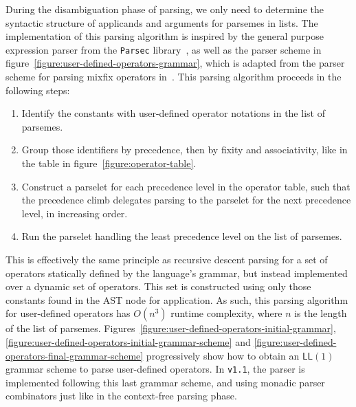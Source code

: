 During the disambiguation phase of parsing, we only need to determine the syntactic structure of applicands and arguments for parsemes in lists.
The implementation of this parsing algorithm is inspired by the general purpose expression parser from the \texttt{Parsec} library~\cite{leijen2001parsec}, as well as the parser scheme in figure~\ref{figure:user-defined-operators-grammar}, which is adapted from the parser scheme for parsing mixfix operators in~\cite{danielsson2008parsing}.
This parsing algorithm proceeds in the following steps:
\begin{enumerate}
\item Identify the constants with user-defined operator notations in the list of parsemes.
\item Group those identifiers by precedence, then by fixity and associativity, like in the table in figure~\ref{figure:operator-table}.
\item Construct a parselet for each precedence level in the operator table, such that the precedence climb delegates parsing to the parselet for the next precedence level, in increasing order.
\item Run the parselet handling the least precedence level on the list of parsemes.
\end{enumerate}
This is effectively the same principle as recursive descent parsing for a set of operators statically defined by the language's grammar, but instead implemented over a dynamic set of operators.
This set is constructed using only those constants found in the \ac{AST} node for application.
As such, this parsing algorithm for user-defined operators has $ O(n^3) $ runtime complexity, where $ n $ is the length of the list of parsemes.
Figures~\ref{figure:user-defined-operators-initial-grammar}, \ref{figure:user-defined-operators-initial-grammar-scheme} and \ref{figure:user-defined-operators-final-grammar-scheme} progressively show how to obtain an $\mathsf{LL}(1)$ grammar scheme to parse user-defined operators.
In \Beluga \texttt{v1.1}, the parser is implemented following this last grammar scheme, and using monadic parser combinators just like in the context-free parsing phase.

